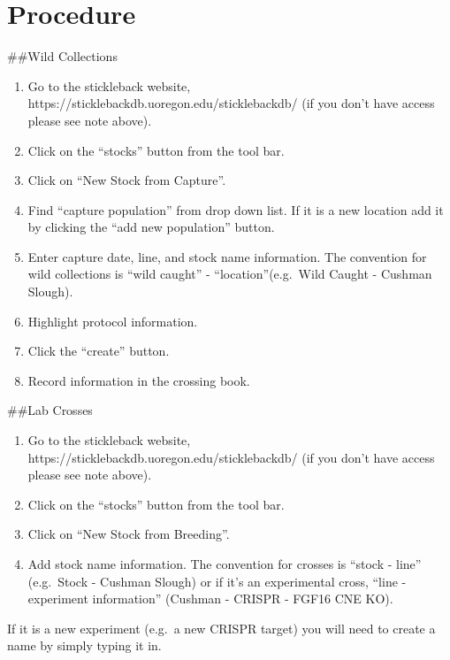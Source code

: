 \documentclass[
  letterpaper,
  DIV=11,
  numbers=noendperiod]{scrreprt}
\providecommand{\tightlist}{%
  \setlength{\itemsep}{0pt}\setlength{\parskip}{0pt}}\usepackage{longtable,booktabs,array}
\begin{document}
\hypertarget{procedure-35}{%
\section{Procedure}\label{procedure-35}}

\#\#Wild Collections

\begin{enumerate}
\def\labelenumi{\arabic{enumi}.}
\tightlist
\item
  Go to the stickleback website,
  https://sticklebackdb.uoregon.edu/sticklebackdb/ (if you don't have
  access please see note above).
\item
  Click on the ``stocks'' button from the tool bar.
\item
  Click on ``New Stock from Capture''.
\item
  Find ``capture population'' from drop down list. If it is a new
  location add it by clicking the ``add new population'' button.
\item
  Enter capture date, line, and stock name information. The convention
  for wild collections is ``wild caught'' - ``location''(e.g.~Wild
  Caught - Cushman Slough).
\item
  Highlight protocol information.
\item
  Click the ``create'' button.
\item
  Record information in the crossing book.
\end{enumerate}

\#\#Lab Crosses

\begin{enumerate}
\def\labelenumi{\arabic{enumi}.}
\tightlist
\item
  Go to the stickleback website,
  https://sticklebackdb.uoregon.edu/sticklebackdb/ (if you don't have
  access please see note above).
\item
  Click on the ``stocks'' button from the tool bar.
\item
  Click on ``New Stock from Breeding''.
\item
  Add stock name information. The convention for crosses is ``stock -
  line'' (e.g.~Stock - Cushman Slough) or if it's an experimental cross,
  ``line - experiment information'' (Cushman - CRISPR - FGF16 CNE KO).
\end{enumerate}

\begin{tcolorbox}[enhanced jigsaw, rightrule=.15mm, title=\textcolor{quarto-callout-warning-color}{\faExclamationTriangle}\hspace{0.5em}{NOTE}, titlerule=0mm, opacitybacktitle=0.6, toprule=.15mm, bottomrule=.15mm, opacityback=0, left=2mm, colframe=quarto-callout-warning-color-frame, breakable, coltitle=black, colback=white, colbacktitle=quarto-callout-warning-color!10!white, bottomtitle=1mm, leftrule=.75mm, toptitle=1mm, arc=.35mm]

If it is a new experiment (e.g.~a new CRISPR target) you will need to
create a name by simply typing it in.

\end{tcolorbox}
\end{document}
